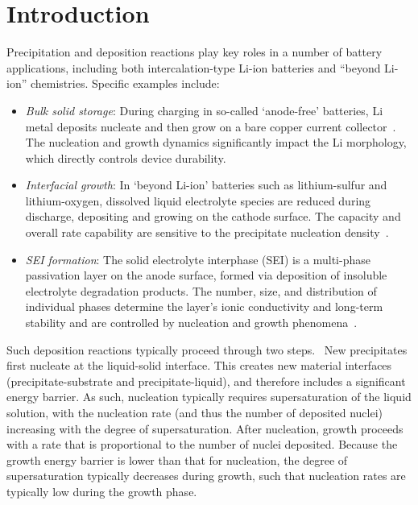 \documentclass[final,3p,times,twocolumn, 12pt]{elsarticle}    %
\begin{document}
\section{Introduction}
Precipitation and deposition reactions play key roles in a number of battery applications, including both intercalation-type Li-ion batteries and ``beyond Li-ion'' chemistries. Specific examples include:
    \begin{itemize}
        \item \textit{Bulk solid storage}: During charging in so-called `anode-free' batteries, Li metal deposits nucleate and then grow on a bare copper current collector~\cite{bib:Li-Cu_deposition}. The nucleation and growth dynamics significantly impact the Li morphology, which directly controls device durability. \cite{bib:PSD_effects_Li,bib:PSD_effects_Li_2,bib:PSD_effects_Li_3,bib:PSD_effects_Li_4,bib:Model_ex_1}
        
        \item \textit{Interfacial growth}: In `beyond Li-ion' batteries such as lithium-sulfur and lithium-oxygen, dissolved liquid electrolyte species are reduced during discharge, depositing and growing on the cathode surface. The capacity and overall rate capability are sensitive to the precipitate nucleation density~\cite{bib:Li-S_deposition,bib:Li-S_deposition_2,bib:Li-O_deposition,bib:Li-air_deposition,bib:Model_ex_2,bib:Model_ex_8}.
               
        \item \textit{SEI formation}: The solid electrolyte interphase (SEI) is a multi-phase passivation layer on the anode surface, formed via deposition of insoluble electrolyte degradation products. The number, size, and distribution of individual phases determine the layer's ionic conductivity and long-term stability and are controlled by nucleation and growth phenomena~\cite{bib:SEI_deposition,bib:SEI_deposition_2,bib:SEI_deposition_3}.
    \end{itemize}

Such deposition reactions typically proceed through two steps.~\cite{bib:classic_nuc_theory} New precipitates first nucleate at the liquid-solid interface. This creates new material interfaces (precipitate-substrate and precipitate-liquid), and therefore includes a significant energy barrier\cite{bib:Model_ex_2}. As such, nucleation typically requires supersaturation of the liquid solution, with the nucleation rate (and thus the number of deposited nuclei) increasing with the degree of supersaturation\cite{bib:supersat}.  After nucleation, growth proceeds with a rate that is proportional to the number of nuclei deposited. Because the growth energy barrier is lower than that for nucleation, the degree of supersaturation typically decreases  during growth, such that nucleation rates are typically low during the growth phase\cite{bib:Li-Cu_deposition}.
\end{document}
